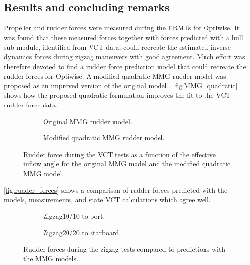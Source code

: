 \subsection*{Results and concluding remarks}
Propeller and rudder forces were measured during the FRMTs for Optiwise. It was found that these measured forces together with forces predicted with a hull sub module, identified from VCT data, could recreate the estimated inverse dynamics forces during zigzag maneuvers with good agreement. Much effort was therefore devoted to find a rudder force prediction model that could recreate the rudder forces for Optiwise. A modified quadratic MMG rudder model was proposed as an improved version of the original model \cite{yasukawaIntroductionMMGStandard2015}. \autoref{fig:MMG_quadratic} shows how the proposed quadratic formulation improves the fit to the VCT rudder force data.  
\begin{figure}[h]
     \centering
     \begin{subfigure}[b]{0.49\textwidth}
         \centering
         
        \caption{Original MMG rudder model.}
        \label{fig:Y_R_MMG_original}
     \end{subfigure}
     \hfill
     \begin{subfigure}[b]{0.49\textwidth}
         \centering
         
        \caption{Modified quadratic MMG rudder model.}
        \label{fig:Y_R_MMG_quadratic}
     \end{subfigure}
    \caption{Rudder force during the VCT tests as a function of the effective inflow angle for the original MMG model and the modified quadratic MMG model.}
    \label{fig:MMG_quadratic}
\end{figure}

\autoref{fig:rudder_forces}  shows a comparison of rudder forces predicted with the models, measurements, and state VCT calculations which agree well. 
\begin{figure}[h]
    \centering
    \begin{subfigure}[b]{\textwidth}
        \centering
        
        \caption{Zigzag10/10 to port.}
        \label{fig:ID_measured_rudder_zigzag_10_10}
    \end{subfigure}
     \vfill
    \begin{subfigure}[b]{\textwidth}
        \centering
        
        \caption{Zigzag20/20 to starboard.}
        \label{fig:ID_measured_rudder_zigzag_20_20}
    \end{subfigure}
    \caption{Rudder forces during the zigzag tests compared to predictions with the MMG models.}
    \label{fig:rudder_forces}
\end{figure}

